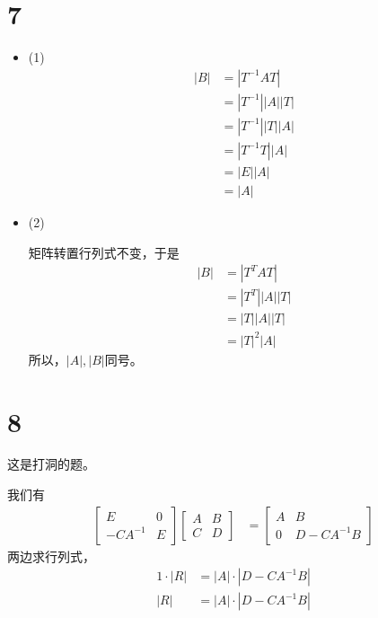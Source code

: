 \documentclass{article}
\begin{document}
\section*{7}

\begin{itemize}
  \item (1)
        \begin{align*}
          |B| & = |T^{-1}AT|       \\
              & = |T^{-1}| |A| |T| \\
              & = |T^{-1}| |T| |A| \\
              & = |T^{-1}T| |A|    \\
              & = |E| |A|          \\
              & = |A|
        \end{align*}

  \item (2)

        矩阵转置行列式不变，于是
        \begin{align*}
          |B| & = |T^{T} A T|     \\
              & = |T^{T}| |A| |T| \\
              & = |T| |A| |T|     \\
              & = |T|^2 |A|
        \end{align*}
        所以，$|A|,|B|$同号。
\end{itemize}

\section*{8}
这是打洞的题。

我们有
\begin{align*}
  \begin{bmatrix}
    E         & 0 \\
    -C A^{-1} & E
  \end{bmatrix}
  \begin{bmatrix}
    A & B \\
    C & D
  \end{bmatrix}
   & = \begin{bmatrix}
         A & B              \\
         0 & D - C A^{-1} B
       \end{bmatrix}
\end{align*}
两边求行列式，
\begin{align*}
  1 \cdot |R| & = |A| \cdot |D - C A^{-1} B| \\
  |R|         & = |A| \cdot |D - C A^{-1} B| \\
\end{align*}
\end{document}
